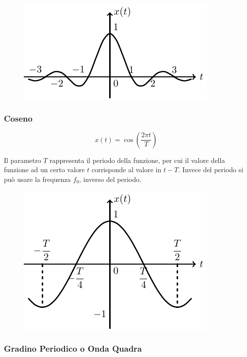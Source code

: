 \documentclass{article}
\numberwithin{equation}{subsection}
\begin{document}
\begin{figure}[H]%
    \centering
    \includegraphics{seno-cardinale.pdf}%
\end{figure}

\subsubsection{Coseno}

\begin{equation}
    x(t)=\cos\left(\displaystyle\frac{2\pi t}{T}\right)
\end{equation}

Il parametro $T$ rappresenta il periodo della funzione, per cui il valore della funzione ad un certo valore $t$ corrisponde al valore in $t-T$. Invece del periodo si può 
usare la frequenza $f_0$, inverso del periodo. 

\begin{figure}[H]%
    \centering
    \includegraphics{coseno.pdf}%
\end{figure}

\subsubsection{Gradino Periodico o Onda Quadra}
\end{document}
